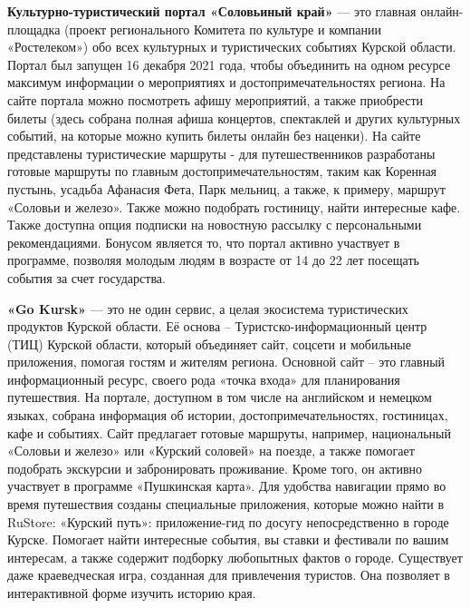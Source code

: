\textbf{Культурно-туристический портал «Соловьиный край»} --- это главная онлайн-площадка (проект регионального Комитета по культуре и компании «Ростелеком») обо всех культурных и туристических событиях Курской области. Портал был запущен 16 декабря 2021 года, чтобы объединить на одном ресурсе максимум информации о мероприятиях и достопримечательностях региона. На сайте портала можно посмотреть афишу мероприятий, а также приобрести билеты (здесь собрана полная афиша концертов, спектаклей и других культурных событий, на которые можно купить билеты онлайн без наценки). На сайте представлены туристические маршруты - для путешественников разработаны готовые маршруты по главным достопримечательностям, таким как Коренная пустынь, усадьба Афанасия Фета, Парк мельниц, а также, к примеру, маршрут «Соловьи и железо». Также можно подобрать гостиницу, найти интересные кафе. Также доступна опция подписки на новостную рассылку с персональными рекомендациями. Бонусом является то, что портал активно участвует в программе, позволяя молодым людям в возрасте от 14 до 22 лет посещать события за счет государства.

\textbf{«Go Kursk»} --- это не один сервис, а целая экосистема туристических продуктов Курской области. Её основа -- Туристско-информационный центр (ТИЦ) Курской области, который объединяет сайт, соцсети и мобильные приложения, помогая гостям и жителям региона. Основной сайт -- это главный информационный ресурс, своего рода «точка входа» для планирования путешествия. На портале, доступном в том числе на английском и немецком языках, собрана информация об истории, достопримечательностях, гостиницах, кафе и событиях. Сайт предлагает готовые маршруты, например, национальный «Соловьи и железо» или «Курский соловей» на поезде, а также помогает подобрать экскурсии и забронировать проживание. Кроме того, он активно участвует в программе «Пушкинская карта». Для удобства навигации прямо во время путешествия созданы специальные приложения, которые можно найти в RuStore: «Курский путь»: приложение-гид по досугу непосредственно в городе Курске. Помогает найти интересные события, вы ставки и фестивали по вашим интересам, а также содержит подборку любопытных фактов о городе. Существует даже краеведческая игра, созданная для привлечения туристов. Она позволяет в интерактивной форме изучить историю края.

